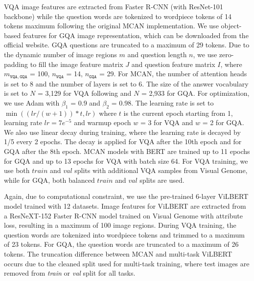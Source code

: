 \documentclass{article}
\begin{document}
VQA image features are extracted from Faster R-CNN (with ResNet-101 backbone) while the question words are tokenized to wordpiece tokens of 14 tokens maximum following the original MCAN implementation. We use object-based features for GQA image representation, which can be downloaded from the official website. GQA questions are truncated to a maximum of 29 tokens. Due to the dynamic number of image regions $m$ and question length $n$, we use zero-padding to fill the image feature matrix $J$ and question feature matrix $I$, where $m_{\mathtt{VQA},\mathtt{GQA}}$ = 100, $n_{\mathtt{VQA}}$ = 14, $n_{\mathtt{GQA}}$ = 29. For MCAN, the number of attention heads is set to 8 and the number of layers is set to 6. The size of the answer vocabulary is set to $N$ = 3,129 for VQA following \citet{yu2019mcan} and $N$ = 2,933 for GQA. For optimization, we use Adam \citep{kingma2014adam} with $\beta_{1}$ = 0.9 and $\beta_{2}$ = 0.98. The learning rate is set to $\min( (lr/(w+1)) * t, lr)$ where $t$ is the current epoch starting from 1, learning rate $lr = 7e^{-5}$ and warmup epoch $w$ = 3 for VQA and $w$ = 2 for GQA. We also use linear decay during training, where the learning rate is decayed by 1/5 every 2 epochs. The decay is applied for VQA after the 10th epoch and for GQA after the 8th epoch. MCAN models with BERT are trained up to 11 epochs for GQA and up to 13 epochs for VQA with batch size 64. For VQA training, we use both $train$ and $val$ splits with additional VQA samples from Visual Genome, while for GQA, both balanced $train$ and $val$ splits are used.

Again, due to computational constraint, we use the pre-trained 6-layer ViLBERT model trained with 12 datasets. Image features for ViLBERT are extracted from a ResNeXT-152 \citep{Xie2016} Faster R-CNN model trained on Visual Genome with attribute loss, resulting in a maximum of 100 image regions. During VQA training, the question words are tokenized into wordpiece tokens and trimmed to a maximum of 23 tokens. For GQA, the question words are truncated to a maximum of 26 tokens. The truncation difference between MCAN and multi-task ViLBERT occurs due to the cleaned split used for multi-task training, where test images are removed from \textit{train} or \textit{val} split for all tasks.

\end{document}
